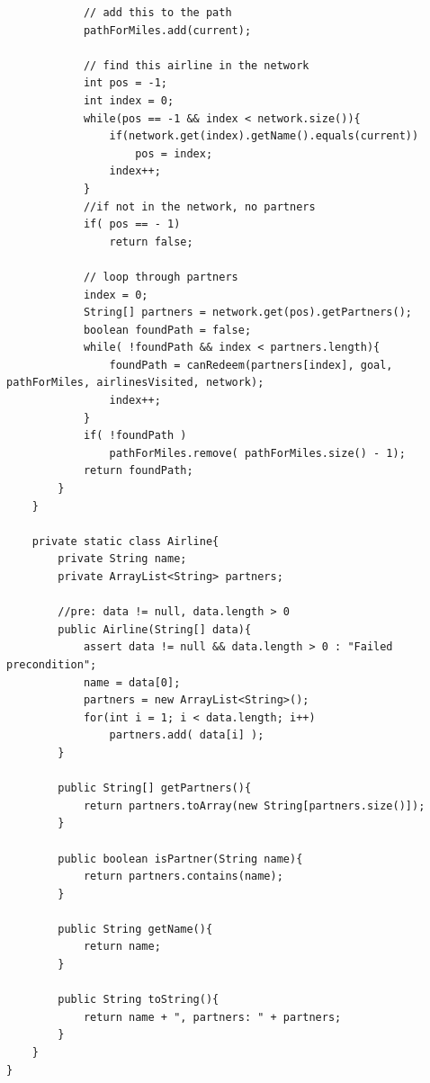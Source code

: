 \begin{lstlisting}
            // add this to the path
            pathForMiles.add(current);
            
            // find this airline in the network
            int pos = -1;
            int index = 0;
            while(pos == -1 && index < network.size()){
                if(network.get(index).getName().equals(current))
                    pos = index;
                index++;
            }
            //if not in the network, no partners
            if( pos == - 1)
                return false;
            
            // loop through partners
            index = 0;
            String[] partners = network.get(pos).getPartners();
            boolean foundPath = false;
            while( !foundPath && index < partners.length){
                foundPath = canRedeem(partners[index], goal, pathForMiles, airlinesVisited, network);
                index++;
            }
            if( !foundPath )
                pathForMiles.remove( pathForMiles.size() - 1);
            return foundPath;
        }
    }

    private static class Airline{
        private String name;
        private ArrayList<String> partners;
        
        //pre: data != null, data.length > 0
        public Airline(String[] data){
            assert data != null && data.length > 0 : "Failed precondition";
            name = data[0];
            partners = new ArrayList<String>();
            for(int i = 1; i < data.length; i++)
                partners.add( data[i] );
        }
        
        public String[] getPartners(){
            return partners.toArray(new String[partners.size()]);
        }
        
        public boolean isPartner(String name){
            return partners.contains(name);
        }
        
        public String getName(){
            return name;
        }
        
        public String toString(){
            return name + ", partners: " + partners;
        }
    }
}

\end{lstlisting}

